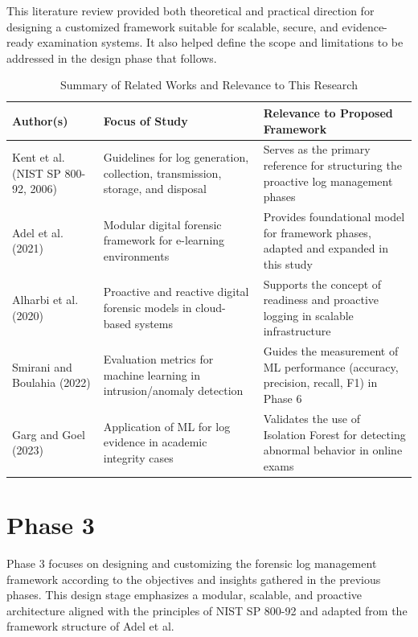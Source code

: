 This literature review provided both theoretical and practical direction for designing a customized framework suitable for scalable, secure, and evidence-ready examination systems. It also helped define the scope and limitations to be addressed in the design phase that follows.
\begin{table}[H]
	\centering
	\caption{Summary of Related Works and Relevance to This Research}
	\label{tab:literature_review}
	\begin{tabular}{|p{3.5cm}|p{4.5cm}|p{4.5cm}|}
		\hline
		\textbf{Author(s)} & \textbf{Focus of Study} & \textbf{Relevance to Proposed Framework} \\
		\hline
		Kent et al. (NIST SP 800-92, 2006) \cite{kentnist800922006guide} & Guidelines for log generation, collection, transmission, storage, and disposal & Serves as the primary reference for structuring the proactive log management phases \\
		\hline
		Adel et al. (2021) \cite{adel2024ethicore} & Modular digital forensic framework for e-learning environments & Provides foundational model for framework phases, adapted and expanded in this study \\
		\hline
		Alharbi et al. (2020) \cite{proactiveandreactivedigitalforensics} & Proactive and reactive digital forensic models in cloud-based systems & Supports the concept of readiness and proactive logging in scalable infrastructure \\
		\hline
		Smirani and Boulahia (2022) \cite{smirani2022algorithm} & Evaluation metrics for machine learning in intrusion/anomaly detection & Guides the measurement of ML performance (accuracy, precision, recall, F1) in Phase 6 \\
		\hline
		Garg and Goel (2023) \citet{garg2023preserving} & Application of ML for log evidence in academic integrity cases & Validates the use of Isolation Forest for detecting abnormal behavior in online exams \\
		\hline
	\end{tabular}
\end{table}

\section{Phase 3}
Phase 3 focuses on designing and customizing the forensic log management framework according to the objectives and insights gathered in the previous phases. This design stage emphasizes a modular, scalable, and proactive architecture aligned with the principles of NIST SP 800-92 and adapted from the framework structure of Adel et al.

